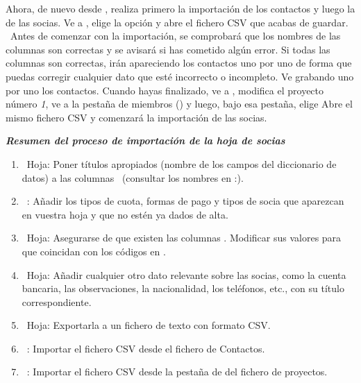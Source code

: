 Ahora, de nuevo desde \appname, realiza primero la importación de los
contactos y luego la de las socias. Ve a
, elige la
opción  y abre el
fichero CSV que acabas de guardar. \ Antes de comenzar con la
importación, se comprobará que los nombres de las columnas son
correctas y se avisará si has cometido algún error. Si todas las
columnas son correctas, irán apareciendo los contactos uno por uno de
forma que puedas corregir cualquier dato que esté incorrecto o
incompleto. Ve grabando uno por uno los contactos. Cuando hayas
finalizado, ve a , modifica el proyecto número \textit{1}, ve a la
pestaña de miembros () y luego, bajo esa
pestaña, elige 
Abre el mismo fichero CSV y comenzará la importación de las socias.



\begin{center}
\begin{minipage}{15.189cm}
{\centering\bfseries\itshape
Resumen del proceso de importación de la hoja de socias
\par}

\liststyleLvi
\begin{enumerate}
\item \ Hoja: Poner títulos apropiados (nombre de los campos del
diccionario de datos) a las columnas \ (consultar los nombres en
\appname:).
\item \ \appname: Añadir los tipos de cuota, formas de pago y tipos de
socia que aparezcan en vuestra hoja y que no estén ya dados de alta.
\item \ Hoja: Asegurarse de que existen las columnas
. Modificar sus valores para que coincidan con los
códigos en \appname.
\item \ Hoja: Añadir cualquier otro dato relevante sobre las socias,
como la cuenta bancaria, las observaciones, la nacionalidad, los
teléfonos, etc., con su título correspondiente.
\item \ Hoja: Exportarla a un fichero de texto con formato CSV.
\item \ \appname: Importar el fichero CSV desde el fichero de Contactos.
\item \ \appname: Importar el fichero CSV desde la pestaña de
 del fichero de
proyectos.
\end{enumerate}
\end{minipage}
\end{center}
